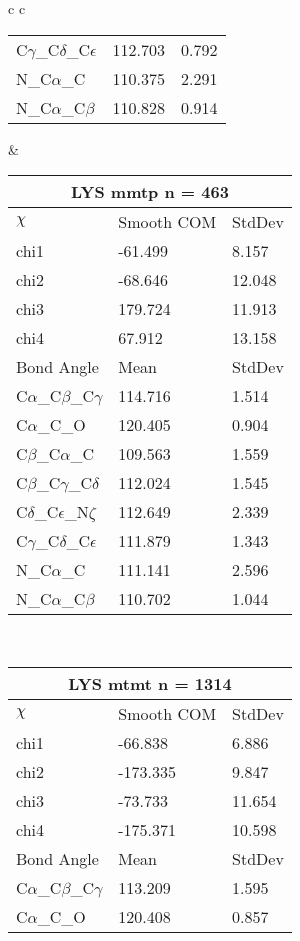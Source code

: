 \begin{longtable}{ c c }
\begin{tabular}{ l l l }
  C$\gamma$\_C$\delta$\_C$\epsilon$ & 112.703 & 0.792\\
  N\_C$\alpha$\_C & 110.375 & 2.291\\
  N\_C$\alpha$\_C$\beta$ & 110.828 & 0.914\\
  \bottomrule
  \end{tabular}
  &
  \begin{tabular}{ l l l }
  \toprule
  \multicolumn{3}{c}{LYS \textbf{mmtp} n = 463} \\ \toprule
  $\chi$       & Smooth COM & StdDev \\ \midrule
  chi1 & -61.499 & 8.157 \\ 
  chi2 & -68.646 & 12.048 \\ 
  chi3 & 179.724 & 11.913 \\ 
  chi4 & 67.912 & 13.158 \\ \midrule
  Bond Angle   & Mean     & StdDev \\ \midrule
  C$\alpha$\_C$\beta$\_C$\gamma$ & 114.716 & 1.514\\
  C$\alpha$\_C\_O & 120.405 & 0.904\\
  C$\beta$\_C$\alpha$\_C & 109.563 & 1.559\\
  C$\beta$\_C$\gamma$\_C$\delta$ & 112.024 & 1.545\\
  C$\delta$\_C$\epsilon$\_N$\zeta$ & 112.649 & 2.339\\
  C$\gamma$\_C$\delta$\_C$\epsilon$ & 111.879 & 1.343\\
  N\_C$\alpha$\_C & 111.141 & 2.596\\
  N\_C$\alpha$\_C$\beta$ & 110.702 & 1.044\\
  \bottomrule
  \end{tabular}
  \\
  \begin{tabular}{ l l l }
  \toprule
  \multicolumn{3}{c}{LYS \textbf{mtmt} n = 1314} \\ \toprule
  $\chi$       & Smooth COM & StdDev \\ \midrule
  chi1 & -66.838 & 6.886 \\ 
  chi2 & -173.335 & 9.847 \\ 
  chi3 & -73.733 & 11.654 \\ 
  chi4 & -175.371 & 10.598 \\ \midrule
  Bond Angle   & Mean     & StdDev \\ \midrule
  C$\alpha$\_C$\beta$\_C$\gamma$ & 113.209 & 1.595\\
  C$\alpha$\_C\_O & 120.408 & 0.857\\

\end{tabular}
\end{longtable}

